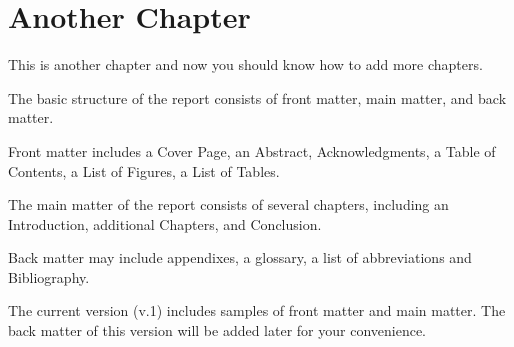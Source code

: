 \chapter{Another Chapter}\label{Ch:another_chapter}

This is another chapter and now you should know how to add more chapters.

The basic structure of the report consists of front matter, main matter, and back matter. 

Front matter includes a Cover Page, an Abstract, Acknowledgments, a Table of Contents, a List of Figures, a List of Tables.

The main matter of the report consists of several chapters, including an Introduction, additional Chapters, and Conclusion.

Back matter may include appendixes, a glossary, a list of abbreviations and Bibliography.

The current version (v.1) includes samples of front matter and main matter. The back matter of this version will be added later for your convenience. 

\endinput